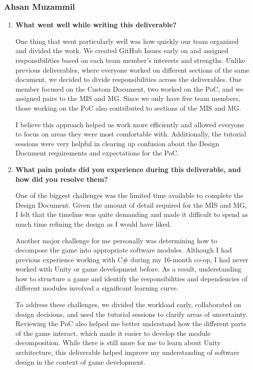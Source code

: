 \documentclass[10pt, titlepage]{article}
\begin{document}
\subsubsection*{Ahsan Muzammil}

\begin{enumerate}
\item \textbf{What went well while writing this deliverable?}

One thing that went particularly well was how quickly our team
organized and divided the work. We created GitHub Issues early
on and assigned responsibilities based on each team member's
interests and strengths. Unlike previous deliverables, where
everyone worked on different sections of the same document,
we decided to divide responsibilities across the deliverables.
One member focused on the Custom Document, two worked on
the PoC, and we assigned pairs to the MIS and MG. Since we
only have five team members, those working on the PoC also
contributed to sections of the MIS and MG.

I believe this approach helped us work more efficiently
and allowed everyone to focus on areas they were most
comfortable with. Additionally, the tutorial sessions were
very helpful in clearing up confusion about the Design
Document requirements and expectations for the PoC.


\item \textbf{What pain points did you experience during this deliverable,
and how did you resolve them?}

One of the biggest challenges was the limited time available
to complete the Design Document. Given the amount of detail
required for the MIS and MG, I felt that the timeline was
quite demanding and made it difficult to spend as much time
refining the design as I would have liked.

Another major challenge for me personally was determining
how to decompose the game into appropriate software modules.
Although I had previous experience working with C\# during
my 16-month co-op, I had never worked with Unity or game
development before. As a result, understanding how to
structure a game and identify the responsibilities and
dependencies of different modules involved a significant
learning curve.

To address these challenges, we divided the workload early,
collaborated on design decisions, and used the tutorial
sessions to clarify areas of uncertainty. Reviewing the
PoC also helped me better understand how the different
parts of the game interact, which made it easier to
develop the module decomposition. While there is still
more for me to learn about Unity architecture, this
deliverable helped improve my understanding of software
design in the context of game development.

\end{enumerate}
\end{document}
